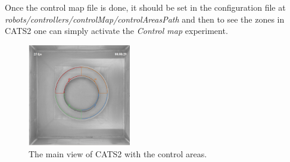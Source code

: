 \documentclass{styles/assisi}
\begin{document}
Once the control map file is done, it should be set in the configuration file at {\it robots/controllers/controlMap/controlAreasPath} and then to see the zones in CATS2 one can simply activate the {\it Control map} experiment. 

\begin{figure}[ht]
\centering
\includegraphics[width=0.4\textwidth]{./figs/epfl-circular-zones.png}
\caption{The main view of CATS2 with the control areas.}
\label{fig:control-areas}
\end{figure}
\end{document}
